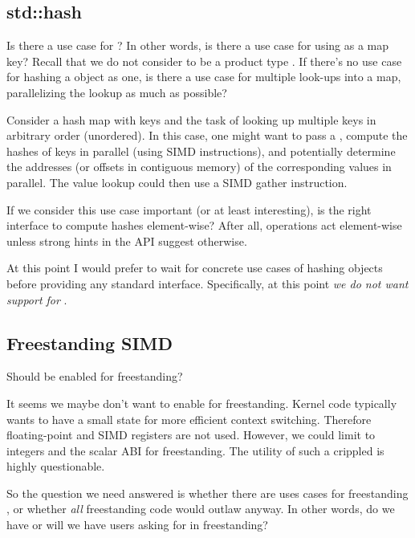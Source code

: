 \subsection{std::hash}\label{sec:hash}

Is there a use case for \std{}?
In other words, is there a use case for using  as a map key?
Recall that we do not consider  to be a product type \cite{P0851R0}.
If there's no use case for hashing a \simd object as one, is there a use case
for multiple look-ups into a map, parallelizing the lookup as much as possible?

Consider a hash map with  keys and the task of looking up multiple
keys in arbitrary order (unordered).
In this case, one might want to pass a , compute the hashes of
 keys in parallel (using SIMD instructions), and
potentially determine the addresses (or offsets in contiguous memory) of the
corresponding values in parallel.
The value lookup could then use a SIMD gather instruction.

If we consider this use case important (or at least interesting), is
\std{} the right interface to compute hashes element-wise?
After all,  operations act element-wise unless strong hints in the
API suggest otherwise.

At this point I would prefer to wait for concrete use cases of hashing \simd
objects before providing any standard interface.
Specifically, at this point \emph{we do not want \std{} support for
\simd}.

\subsection{Freestanding SIMD}\label{sec:freestanding}
Should  be enabled for freestanding?

It seems we maybe don't want to enable \simd for freestanding.
Kernel code typically wants to have a small state for more efficient
context switching.
Therefore floating-point and SIMD registers are not used.
However, we could limit \simd to integers and the scalar ABI for freestanding.
The utility of such a crippled \simd is highly questionable.

So the question we need answered is whether there are uses cases for
freestanding \simd, or whether \emph{all} freestanding code would outlaw \simd
anyway.
In other words, do we have or will we have users asking for \simd in
freestanding?

